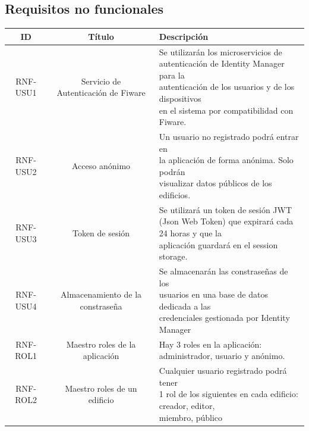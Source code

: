 \documentclass[12pt, a4paper, twoside]{article}
\begin{document}
{\footnotesize
 \subsection{Requisitos no funcionales}
 \begin{longtable}{ |c|c|l| }
  \hline
  ID       & Título & Descripción \\ \hline

  RNF-USU1 & \makecell{Servicio de \\Autenticación de Fiware}
  & \makecell[l]{Se utilizarán los microservicios de \\
  autenticación de Identity Manager para la \\
  autenticación de los usuarios y de los dispositivos \\
  en el sistema por compatibilidad con Fiware.
  } \\ \hline
  
  RNF-USU2 & Acceso anónimo 
  & \makecell[l]{Un usuario no registrado podrá entrar en \\
   la aplicación de forma anónima. Solo podrán\\
   visualizar datos públicos de los edificios.
   } \\ \hline
  
  RNF-USU3 & Token de sesión 
  & \makecell[l]{Se utilizará un token de sesión JWT \\
  (Json Web Token) que expirará cada 24 horas y que la \\
  aplicación guardará en el session storage.
   } \\ \hline
   
  RNF-USU4 & Almacenamiento de la constraseña 
  & \makecell[l]{Se almacenarán las constraseñas de los \\
  usuarios en una base de datos dedicada a las \\
  credenciales gestionada por Identity Manager
  } \\ \hline 
  RNF-ROL1 & Maestro roles de la aplicación 
  & \makecell[l]{Hay 3 roles en la aplicación: \\
  administrador, usuario y anónimo.
  } \\ \hline
  RNF-ROL2 & Maestro roles de un edificio 
  & \makecell[l]{Cualquier usuario registrado podrá tener \\
  1 rol de los siguientes en cada edificio:  creador, editor,\\
  miembro, público
  } \\ \hline


\end{longtable}}
\end{document}
